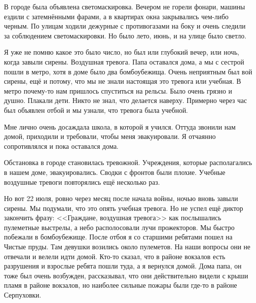 В городе была объявлена светомаскировка. Вечером не горели фонари, машины ездили с затемнёнными фарами, а в квартирах окна закрывались чем-либо черным.
По улицам ходили дежурные с противогазами на боку и очень следили за соблюдением светомаскировки. Но было лето, июнь, и на улице было светло.

Я уже не помню какое это было число, но был или глубокий вечер, или ночь, когда завыли сирены. Воздушная тревога. Папа оставался дома, а мы с сестрой пошли в метро, хотя в доме было два бомбоубежища. Очень неприятным был вой сирены, ещё и потому, что мы не знали настоящая это тревога или учебная. В метро почему-то нам пришлось спуститься на рельсы. Было очень грязно и душно. Плакали дети. Никто не знал, что делается наверху. Примерно через час был объявлен отбой и мы узнали, что тревога была учебной.

Мне лично очень досаждала школа, в которой я учился. Оттуда звонили нам домой, приходили и требовали, чтобы меня эвакуировали. Я отчаянно сопротивлялся и пока оставался дома.

Обстановка в городе становилась тревожной. Учреждения, которые располагались в нашем доме, эвакуировались. Сводки с фронтов были плохие. Учебные воздушные тревоги повторялись ещё несколько раз.

Но вот 22 июля, ровно через месяц после начала войны, ночью вновь завыли сирены. Мы подумали, что это опять учебная тревога. Но не успел ещё диктор закончить фразу: <<Граждане, воздушная тревога>> как послышались пулеметные выстрелы, а небо располосовали лучи прожекторов. Мы быстро побежали в бомбоубежище. После отбоя я со старшими ребятами пошел на Чистые пруды. Там девушки возились около пулеметов. На наши вопросы они не отвечали и велели идти домой. Кто-то сказал, что в районе вокзалов есть разрушения и взрослые ребята пошли туда, а я вернулся домой. Дома папа, он тоже был очень возбужден, рассказывал, что они действительно видели с крыши пламя в районе вокзалов, но наиболее сильные пожары были где-то в районе Серпуховки.

